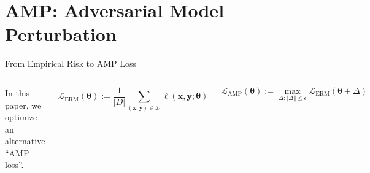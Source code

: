 \section{AMP: Adversarial Model Perturbation}

\begin{frame}{From Empirical Risk to AMP Loss}

\begin{columns}


In this paper, we optimize an alternative ``AMP loss''.

\vspace{1em}

\begin{equation*}
\mathcal{L}_\mathrm{ERM}(\boldsymbol{\theta}):=\frac{1}{|D|}\sum_{(\boldsymbol{x},\boldsymbol{y})\in\mathcal{D}}\ell(\boldsymbol{x},\boldsymbol{y};\boldsymbol{\theta})
\end{equation*}

\vspace{1em}

\begin{equation*}
\mathcal{L}_\mathrm{AMP}(\boldsymbol{\theta}):=\max_{\Delta:\Vert\Delta\Vert\le\epsilon}\mathcal{L}_\mathrm{ERM}(\boldsymbol{\theta}+\Delta)
\end{equation*}

\vspace{2em}



\end{columns}
\end{frame}
